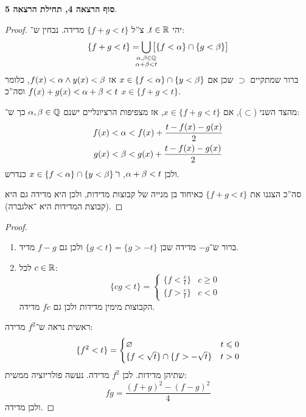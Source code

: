 \documentclass[name=רשימות פונקציות ממשיות – WIP]{../../../tex/classes/noChapterMegasumPreamble}
\newcommand \lectext[1] {{\color{blue}\textbf{#1}}}
\newcommand \nthlec[2]  {\lectext{סוף הרצאה #1, תחילת הרצאה #2}}
\begin{document}
	\nthlec{4}{5}. 
	\begin{proof}
		יהי $t \in \mathbb{R}$. צ''ל $\{f + g < t\}$ מדידה. נבחין ש־: 
		\[ \{f  +g < t\} = \bigcup_{\mathclap{\substack{\ag, \bg \in \Q \\ \ag + \bg < t}}} \big[{\{f < \ag \}\cap \{g < \bg\}}\big] \]
		ברור שמתקיים $\supset$ שכן אם $x \in \{f < \alpha\} \cap \{y < \beta\}$ אז $f(x) < \alpha \land y(x) < \beta$, כלומר $f(x) + g(x) < \alpha + \beta < t$ וסה''כ $x \in\{f + g < t\}$. 
		
		מהצד השני ($\subset$), אם $x \in \{f + g < t\}$, אז מצפיפות הרציונליים ישנם $\alpha, \beta \in \mathbb{Q}$ כך ש־: 
		\begin{gather*}
			f(x) < \alpha < f(x) + \frac{t - f(x) - g(x)}{2} \\
			g(x) < \beta < g(x) + \frac{t - f(x) - g(x)}{2}
		\end{gather*}
		ולכן $\alpha + \beta < t$, ו־$x \in \{f < \alpha\} \cap \{y < \beta\}$ כנדרש. 
		
		סה''כ הצגנו את $\{f + g < t\}$ כאיחוד בן מנייה של קבוצות מדידות, ולכן היא מדידה גם היא (קבוצת המדידות היא \ס־אלגברה). 
	\end{proof}
	\begin{proof}
		\begin{enumerate}
			\item ברור ש־$-g$ מדידה שכן $\{g < t\} = \{g > -t\}$ ולכן גם $f - g$ מדיד. 
			\item לכל $c \in \mathbb{R}$: 
			\[ \{cg < t\} = \begin{cases}
				\{f < \frac{c}{t}\} & c \ge 0 \\
				\{f > \frac{c}{t}\} & c < 0
			\end{cases} \]
			הקבוצות מימין מדידות ולכן גם $fc$ מדידה. 
		\end{enumerate}
		\item ראשית נראה ש־$f^{2}$ מדידה: 
		\[ \{f^{2} < t\} = \begin{cases}
			\varnothing & t \leqslant 0 \\
			\{f < \sqrt t\} \cap \{f > -\sqrt t\} & t > 0
		\end{cases} \]
		שתיהן מדידות. לכן $f^{2}$ מדידה. נעשה פולריזציה ממשית: 
		\[ fg = \frac{(f + g)^{2} - (f - g)^{2}}{4} \]
		ולכן מדידה. 
	\end{proof}
	
\end{document}

